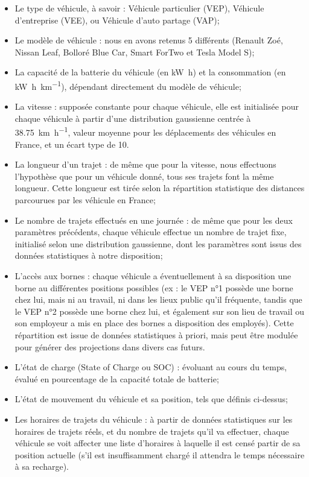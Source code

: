 \documentclass[10pt]{article}
\begin{document}
		\begin{itemize}
			\item Le type de véhicule, à savoir : Véhicule particulier (VEP), Véhicule d'entreprise (VEE), ou Véhicule d'auto partage (VAP);
			\item Le modèle de véhicule : nous en avons retenus 5 différents (Renault Zoé, Nissan Leaf, Bolloré Blue Car, Smart ForTwo et Tesla Model S);
			\item La capacité de la batterie du véhicule (en \si{\kilo\watt\hour}) et la consommation (en \si{\kilo\watt\hour\per\kilo\meter}), dépendant directement du modèle de véhicule;
			\item La vitesse : supposée constante pour chaque véhicule, elle est initialisée pour chaque véhicule à partir d'une distribution gaussienne centrée à \SI{38,75}{\kilo\meter\per\hour}, valeur moyenne pour les déplacements des véhicules en France, et un écart type de 10.
			\item La longueur d'un trajet : de même que pour la vitesse, nous effectuons l'hypothèse que pour un véhicule donné, tous ses trajets font la même longueur. Cette longueur est tirée selon la répartition statistique des distances parcourues par les véhicule en France;
			\item Le nombre de trajets effectués en une journée : de même que pour les deux paramètres précédents, chaque véhicule effectue un nombre de trajet fixe, initialisé selon une distribution gaussienne, dont les paramètres sont issus des données statistiques à notre disposition;
			\item L'accès aux bornes : chaque véhicule a éventuellement à sa disposition une borne au différentes positions possibles (ex : le VEP n°1 possède une borne chez lui, mais ni au travail, ni dans les lieux public qu'il fréquente, tandis que le VEP n°2 possède une borne chez lui, et également sur son lieu de travail ou son employeur a mis en place des bornes a disposition des employés). Cette répartition est issue de données statistiques à priori, mais peut être modulée pour générer des projections dans divers cas futurs.  
			\item L'état de charge (State of Charge ou SOC) : évoluant au cours du temps, évalué en pourcentage de la capacité totale de batterie;
			\item L'état de mouvement du véhicule et sa position, tels que définis ci-dessus;
			\item Les horaires de trajets du véhicule : à partir de données statistiques sur les horaires de trajets réels, et du nombre de trajets qu'il va effectuer, chaque véhicule se voit affecter une liste d'horaires à laquelle il est censé partir de sa position actuelle (s'il est insuffisamment chargé il attendra le temps nécessaire à sa recharge).
		\end{itemize}
		
\end{document}
